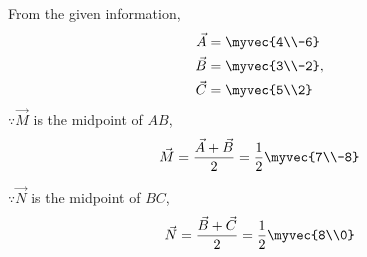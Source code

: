 %
From the given information, 
\begin{align}
\label{eq:constr_a}
\vec{A} &= \myvec{4\\-6} 
\\
\vec{B} &= \myvec{3\\-2}, 
\label{eq:constr_b}
\\
\vec{C} &= \myvec{5\\2}
\label{eq:constr_c}
\end{align}
$\because \vec{M}$ is the midpoint of $AB$,
\begin{align}
\vec{M}= \frac{\vec{A}+\vec{B}}{2} = \frac{1}{2}\myvec{7\\-8}
\label{eq:constr_m}
\end{align}

$\because \vec{N}$ is the midpoint of $BC$,
\begin{align}
\vec{N}= \frac{\vec{B}+\vec{C}}{2} = \frac{1}{2}\myvec{8\\0}
\label{eq:constr_n}
\end{align}

